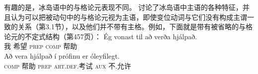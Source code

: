 \noindent
有趣的是，冰岛语中的与格论元表现不同。 \citet{ZMT85a}讨论了冰岛语中主语的各种特征，并且认为可以把被动句中的与格论元视为主语，即使变位动词与它们没有构成主谓一致的关系（第3.1节），以及他们并不带有主格。例如，下面就是带有被省略的与格论元的不定式结构（第457页）：
\eal
\ex 
\gll Ég vonast til  að verða hjálpað.\\
     我 希望    \textsc{prep} \textsc{comp} \passive{} 帮助\\
\ex
\gll Að vera hjálpað í prófinu er óleyfilegt.\\
     \textsc{comp} \passive{} 帮助 \textsc{prep} \textsc{art}.\textsc{def}.考试 \textsc{aux} 不.允许\\
\zl

